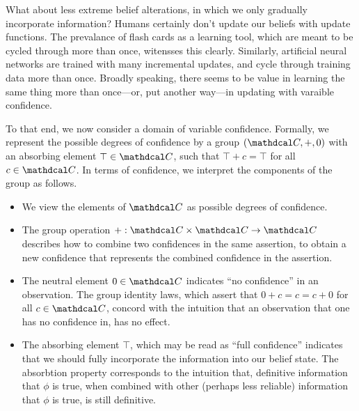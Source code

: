 \documentclass{article}
\def\confdom{\mathdcal C}
\begin{document}
\begin{enumerate}
    \TODO


\end{enumerate}
%

What about less extreme belief alterations, in which we only gradually incorporate information?
Humans certainly don't update our beliefs with update functions.
The prevalance of flash cards as a learning tool, which are meant to be cycled through more than once, witensses this clearly.
Similarly, artificial neural networks are trained with many incremental updates, and cycle through training data more than once.
Broadly speaking, there seems to be value in learning the same thing more than once---or, put another way---in updating with varaible confidence.

To that end, we now consider a domain of variable confidence. Formally, we represent the possible degrees of confidence by a group $(\confdom, +, 0)$ with an absorbing element $\top \in \confdom$, such that $\top + c = \top$ for all $c \in \confdom$.
In terms of confidence, we interpret the components of the group as follows.
\begin{itemize}%
    \item
    We view the elements of $\confdom$ as possible degrees of confidence.
    \item The group operation $+ : \confdom \times \confdom \to \confdom$ describes how to combine two confidences in the same assertion, to obtain a new confidence that represents the combined confidence in the assertion.
    \item The neutral element $0 \in \confdom$ indicates ``no confidence'' in an observation.
        The group identity laws, which assert that
        $0 + c = c = c + 0$ for all $c \in \confdom$,
        concord with the intuition that an observation that one has no confidence in, has no effect.
    \item The absorbing element $\top$, which may be read as ``full confidence'' indicates that we should fully incorporate the information into our belief state.
    The absorbtion property corresponds to the intuition that, definitive information that $\phi$ is true, when combined with other (perhaps less reliable) information that $\phi$ is true, is still definitive.
\end{itemize}
\end{document}
